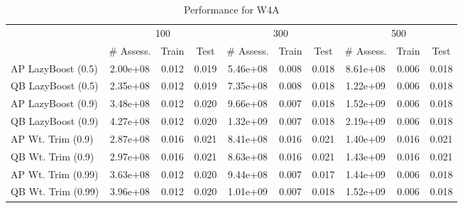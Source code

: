 \begin{table*}[ht]
\caption{Performance for W4A}
\label{tbl:perf-w4a}
\vskip 0.15in
\begin{center}
\begin{small}
\begin{sc}
\begin{tabular}{lccccccccc}
\toprule
	& \multicolumn{3}{c}{100}
	& \multicolumn{3}{c}{300}
	& \multicolumn{3}{c}{500}
	\\
 & \# Assess. & Train & Test & \# Assess. & Train & Test & \# Assess. & Train & Test \\
\midrule
AP LazyBoost (0.5) & 2.00e+08 & 0.012 & 0.019 & 5.46e+08 & 0.008 & 0.018 & 8.61e+08 & 0.006 & 0.018 \\
QB LazyBoost (0.5) & 2.35e+08 & 0.012 & 0.019 & 7.35e+08 & 0.008 & 0.018 & 1.22e+09 & 0.006 & 0.018 \\
AP LazyBoost (0.9) & 3.48e+08 & 0.012 & 0.020 & 9.66e+08 & 0.007 & 0.018 & 1.52e+09 & 0.006 & 0.018 \\
QB LazyBoost (0.9) & 4.27e+08 & 0.012 & 0.020 & 1.32e+09 & 0.007 & 0.018 & 2.19e+09 & 0.006 & 0.018 \\
AP Wt. Trim (0.9) & 2.87e+08 & 0.016 & 0.021 & 8.41e+08 & 0.016 & 0.021 & 1.40e+09 & 0.016 & 0.021 \\
QB Wt. Trim (0.9) & 2.97e+08 & 0.016 & 0.021 & 8.63e+08 & 0.016 & 0.021 & 1.43e+09 & 0.016 & 0.021 \\
AP Wt. Trim (0.99) & 3.63e+08 & 0.012 & 0.020 & 9.44e+08 & 0.007 & 0.017 & 1.44e+09 & 0.006 & 0.018 \\
QB Wt. Trim (0.99) & 3.96e+08 & 0.012 & 0.020 & 1.01e+09 & 0.007 & 0.018 & 1.52e+09 & 0.006 & 0.018 \\
\bottomrule
\end{tabular}
\end{sc}
\end{small}
\end{center}
\vskip -0.1in
\end{table*}
